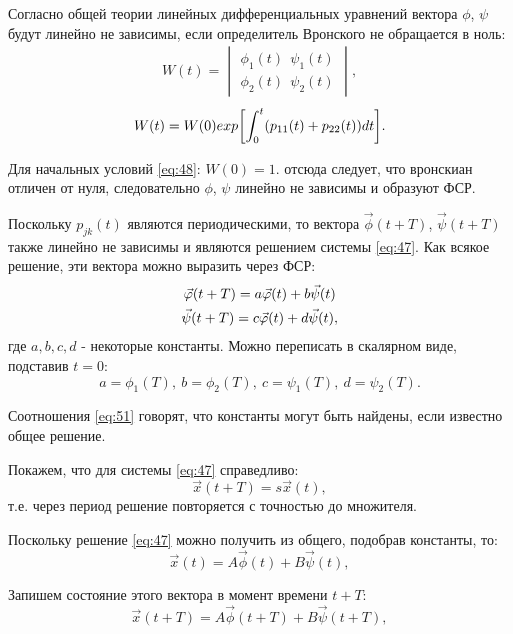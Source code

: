 Согласно общей теории линейных дифференциальных уравнений вектора $\phi$, $\psi$  будут линейно не зависимы, если определитель Вронского не обращается в ноль:
\begin{gather*}
	W(t)= 
	\begin{vmatrix}
		\phi_1(t) ~~\psi_1(t) \\ 
		\phi_2(t) ~~\psi_2(t)
	\end{vmatrix}
	,
\end{gather*}
\begin{equation}
	W(t)=W(0)exp\qty[\int_0^t(p_{11}(t)+p_{22}(t))dt].
	\label{eq:49}	
\end{equation}

Для начальных условий \eqref{eq:48}: $W(0)=1$. отсюда следует, что вронскиан отличен от нуля, следовательно $\phi$, $\psi$ линейно не зависимы и образуют ФСР.

Поскольку $p_{jk}(t)$ являются периодическими, то вектора $\vec{\phi}(t+T)$, $\vec{\psi}(t+T)$ также линейно не зависимы и являются решением системы \eqref{eq:47}. Как всякое решение, эти вектора можно выразить через ФСР:
\begin{gather}
	\vec{\phi}(t+T)=a\vec{\phi}(t)+b\vec{\psi}(t) \notag \\ 
	\vec{\psi}(t+T)=c\vec{\phi}(t)+d\vec{\psi}(t),		
	\label{eq:50}
\end{gather}
где $a,b,c,d$ - некоторые константы. Можно переписать в скалярном виде, подставив $t=0$:
\begin{equation}
	a=\phi_1(T),~ b=\phi_2(T),~ c=\psi_1(T),~ d=\psi_2(T).
	\label{eq:51}	
\end{equation}

Соотношения \eqref{eq:51} говорят, что константы могут быть найдены, если известно общее решение.

Покажем, что для системы  \eqref{eq:47} справедливо:
\begin{equation}
	\vec{x}(t+T)=s\vec{x}(t),
	\label{eq:52}	
\end{equation}
т.е. через период решение повторяется с точностью до множителя.

Поскольку решение \eqref{eq:47} можно получить из общего, подобрав константы, то:
\begin{equation}
	\vec{x}(t)=A\vec{\phi}(t)+B\vec{\psi}(t),
	\label{eq:53}	
\end{equation}

Запишем состояние этого вектора в момент времени $t+T$:
\begin{equation}
	\vec{x}(t+T)=A\vec{\phi}(t+T)+B\vec{\psi}(t+T),
	\label{eq:54}	
\end{equation}

